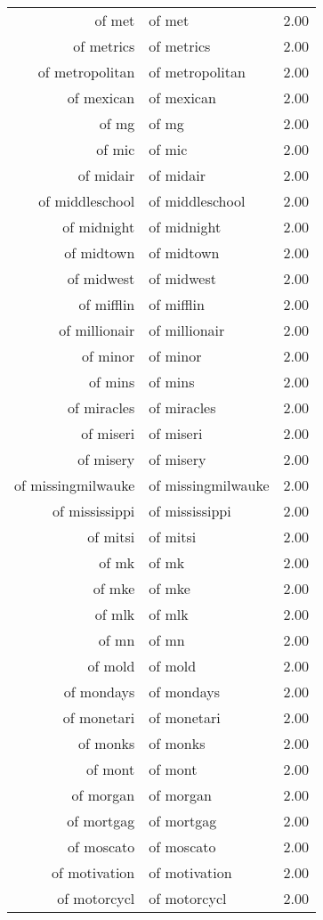 \begin{table}[ht]
\begin{tabular}{rlr}
  of met & of met & 2.00 \\ 
  of metrics & of metrics & 2.00 \\ 
  of metropolitan & of metropolitan & 2.00 \\ 
  of mexican & of mexican & 2.00 \\ 
  of mg & of mg & 2.00 \\ 
  of mic & of mic & 2.00 \\ 
  of midair & of midair & 2.00 \\ 
  of middleschool & of middleschool & 2.00 \\ 
  of midnight & of midnight & 2.00 \\ 
  of midtown & of midtown & 2.00 \\ 
  of midwest & of midwest & 2.00 \\ 
  of mifflin & of mifflin & 2.00 \\ 
  of millionair & of millionair & 2.00 \\ 
  of minor & of minor & 2.00 \\ 
  of mins & of mins & 2.00 \\ 
  of miracles & of miracles & 2.00 \\ 
  of miseri & of miseri & 2.00 \\ 
  of misery & of misery & 2.00 \\ 
  of missingmilwauke & of missingmilwauke & 2.00 \\ 
  of mississippi & of mississippi & 2.00 \\ 
  of mitsi & of mitsi & 2.00 \\ 
  of mk & of mk & 2.00 \\ 
  of mke & of mke & 2.00 \\ 
  of mlk & of mlk & 2.00 \\ 
  of mn & of mn & 2.00 \\ 
  of mold & of mold & 2.00 \\ 
  of mondays & of mondays & 2.00 \\ 
  of monetari & of monetari & 2.00 \\ 
  of monks & of monks & 2.00 \\ 
  of mont & of mont & 2.00 \\ 
  of morgan & of morgan & 2.00 \\ 
  of mortgag & of mortgag & 2.00 \\ 
  of moscato & of moscato & 2.00 \\ 
  of motivation & of motivation & 2.00 \\ 
  of motorcycl & of motorcycl & 2.00 \\ 

\end{tabular}
\end{table}
